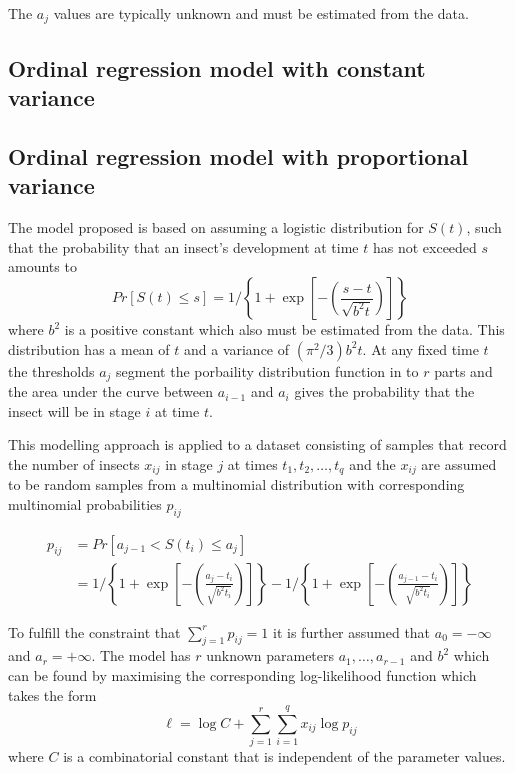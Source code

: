 The $a_j$ values are typically unknown and must be estimated from the data.
\subsection{Ordinal regression model with constant variance }
\subsection{Ordinal regression model with proportional variance}
The model \citet{dennis1986stochastic} proposed is based on assuming a logistic distribution for $S(t)$, such that the probability that an insect's development at time $t$ has not exceeded $s$ amounts to 
\begin{equation}
Pr[S(t) \leq s] = 1 \bigg/ \left\{ 1 + \exp\left[-\left(\frac{s-t}{\sqrt{b^2t}}\right)\right]\right\}
\end{equation}
where $b^2$ is a positive constant which also must be estimated from the data. This distribution has a mean of $t$ and a variance of $(\pi^2/3)b^2t$.
At any fixed time $t$ the thresholds $a_j$ segment the porbaility distribution function in to $r$ parts and the area under the curve between $a_{i-1}$ and $a_i$ gives the probability that the insect will be in stage $i$ at time $t$.

This modelling approach is applied to a dataset consisting of samples that record the number of insects $x_{ij}$ in stage $j$ at times $t_1, t_2, \dots, t_q$ and the $x_{ij}$ are assumed to be random samples from a multinomial distribution with corresponding multinomial probabilities $p_{ij}$

\begin{align}
p_{ij} & = Pr[a_{j-1} < S(t_i) \leq a_{j}]\\
& = 1 \bigg/ \left\{ 1 + \exp\left[-\left(\frac{a_j-t_i}{\sqrt{b^2t_i}}\right)\right]\right\} - 1 \bigg/ \left\{ 1 + \exp\left[-\left(\frac{a_{j-1}-t_i}{\sqrt{b^2t_i}}\right)\right]\right\}
\end{align}

To fulfill the constraint that $\sum_{j=1}^r p_{ij}= 1$ it is further assumed that $a_0 = -\infty$ and $a_r = +\infty$.
The model has $r$ unknown parameters $a_1, \dots, a_{r-1}$ and $b^2$ which can be found by maximising the corresponding log-likelihood function which takes the form 
\begin{equation}
\mathcal{\ell} = \log C + \sum_{j=1}^r \sum_{i=1}^q x_{ij} \log p_{ij}
\label{eq:dennis_loglik}
\end{equation}
where $C$ is a combinatorial constant that is independent of the parameter values.


